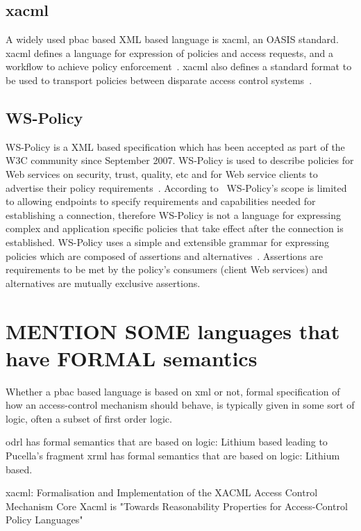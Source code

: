 \subsection{xacml}
A widely used \ac{pbac} based XML based language is \ac{xacml}, an OASIS standard. \ac{xacml} defines a language for expression of policies and access requests, and a workflow to achieve policy enforcement~\cite{DBLP:conf/essos/MasiPT12}. \ac{xacml} also defines a standard format to be used to transport policies
between disparate access control systems~\cite{ArdagnaDVS04}.

\subsection{WS-Policy}
WS-Policy is a XML based specification which has been accepted as part of the W3C community since September 2007. WS-Policy is used to describe policies for Web services on security, trust, quality, etc and for Web service clients to advertise their policy requirements~\cite{wspolicy}.
According to~\cite{wspolicy} WS-Policy's scope is limited to allowing endpoints to specify requirements and capabilities needed for establishing a connection, therefore WS-Policy is not a language for expressing complex and application specific policies that take effect after the connection is established. WS-Policy uses a simple and extensible grammar for expressing policies which are composed of assertions and alternatives~\cite{wspolicy}. Assertions are requirements to be met by the policy's consumers (client Web services) and alternatives are mutually exclusive assertions. 

\section{MENTION SOME languages that have FORMAL semantics}

Whether a \ac{pbac} based language is based on \ac{xml} or not, formal specification of how an access-control mechanism should behave, is typically given in some sort of logic, often a subset of first order logic. 

odrl has formal semantics that are based on logic: Lithium based leading to Pucella's fragment
xrml has formal semantics that are based on logic: Lithium based.

xacml: 
Formalisation and Implementation of the XACML Access Control Mechanism
Core Xacml is "Towards Reasonability Properties for Access-Control Policy Languages"

